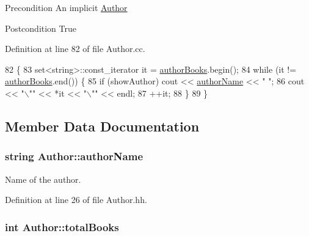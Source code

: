 \begin{DoxyPrecond}{Precondition}
An implicit \hyperlink{class_author}{Author} 
\end{DoxyPrecond}
\begin{DoxyPostcond}{Postcondition}
True 
\end{DoxyPostcond}


Definition at line 82 of file Author.\+cc.


\begin{DoxyCode}
82                                        \{
83     set<string>::const\_iterator it = \hyperlink{class_author_ad9ffe450cdafed2242936f6fcafa22b4}{authorBooks}.begin();
84     \textcolor{keywordflow}{while} (it != \hyperlink{class_author_ad9ffe450cdafed2242936f6fcafa22b4}{authorBooks}.end()) \{
85         \textcolor{keywordflow}{if} (showAuthor) cout << \hyperlink{class_author_a146b76b89d701097c36fb5d29df27bc4}{authorName} << \textcolor{stringliteral}{" "};
86         cout << \textcolor{stringliteral}{"\(\backslash\)""} << *it << \textcolor{stringliteral}{"\(\backslash\)""} << endl;
87         ++it;
88     \}
89 \}\end{DoxyCode}


\subsection{Member Data Documentation}
\subsubsection[{\texorpdfstring{author\+Name}{authorName}}]{\setlength{\rightskip}{0pt plus 5cm}string Author\+::author\+Name\hspace{0.3cm}{\ttfamily [private]}}\hypertarget{class_author_a146b76b89d701097c36fb5d29df27bc4}{}\label{class_author_a146b76b89d701097c36fb5d29df27bc4}


Name of the author. 



Definition at line 26 of file Author.\+hh.

\subsubsection[{\texorpdfstring{total\+Books}{totalBooks}}]{\setlength{\rightskip}{0pt plus 5cm}int Author\+::total\+Books\hspace{0.3cm}{\ttfamily [private]}}\hypertarget{class_author_ac870b8c861aa0f69cd2c4e7b8d414902}{}\label{class_author_ac870b8c861aa0f69cd2c4e7b8d414902}


